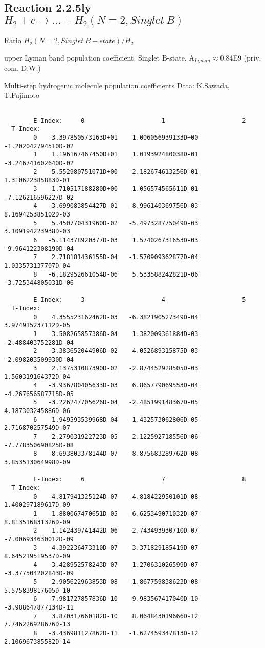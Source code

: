 \documentclass[12pt,dvipdfmx]{article}
\begin{document}
\newpage


\subsection{
Reaction 2.2.5ly $H_2 + e \rightarrow ...+ H_2(N=2,Singlet \ B)$}

Ratio $H_2(N=2, Singlet \ B-state)/H_2 $

upper Lyman band population coefficient. Singlet B-state, A$_{Lyman} \approx $0.84E9 (priv. com. D.W.)

 Multi-step hydrogenic molecule population coefficients
 Data: K.Sawada, T.Fujimoto \cite{kn:Sawada}
\begin{small}\begin{verbatim}

        E-Index:     0                     1                     2
  T-Index:
        0   -3.397850573163D+01    1.006056939133D+00   -1.202042794510D-02
        1    1.196167467450D+01    1.019392480038D-01   -3.246741602640D-02
        2   -5.552980751071D+00   -2.182674613256D-01    1.310622385883D-01
        3    1.710517188280D+00    1.056574565611D-01   -7.126216596227D-02
        4   -3.699083854427D-01   -8.996140369756D-03    8.169425385102D-03
        5    5.450770431960D-02   -5.497328775049D-03    3.109194223938D-03
        6   -5.114378920377D-03    1.574026731653D-03   -9.964122308190D-04
        7    2.718181436155D-04   -1.570909362877D-04    1.033573137707D-04
        8   -6.182952661054D-06    5.533588242821D-06   -3.725344805031D-06

        E-Index:     3                     4                     5
  T-Index:
        0    4.355523162462D-03   -6.382190527349D-04    3.974915237112D-05
        1    3.508265857386D-04    1.382009361884D-03   -2.488403752281D-04
        2   -3.383652044906D-02    4.052689315875D-03   -2.098203509930D-04
        3    2.137531087390D-02   -2.874452928505D-03    1.560319164372D-04
        4   -3.936780405633D-03    6.865779069553D-04   -4.267656587715D-05
        5   -3.226247705626D-04   -2.485199148367D-05    4.187303245886D-06
        6    1.949593539968D-04   -1.432573062806D-05    2.716870257549D-07
        7   -2.279031922723D-05    2.122592718556D-06   -7.778350690825D-08
        8    8.693803378144D-07   -8.875683289762D-08    3.853513064998D-09

        E-Index:     6                     7                     8
  T-Index:
        0   -4.817941325124D-07   -4.818422950101D-08    1.400297189617D-09
        1    1.880067470651D-05   -6.625349071032D-07    8.813516831326D-09
        2    1.142439741442D-06    2.743493930710D-07   -7.006934630012D-09
        3    4.392236473310D-07   -3.371829185419D-07    8.645219519537D-09
        4   -3.428952578243D-07    1.270631026599D-07   -3.377504202843D-09
        5    2.905622963853D-08   -1.867759838623D-08    5.575839817605D-10
        6   -7.981727857836D-10    9.983567417040D-10   -3.988647877134D-11
        7    3.870317660182D-10    8.064843019666D-12    7.746226928676D-13
        8   -3.436981127862D-11   -1.627459347813D-12    2.106967385582D-14


\end{verbatim}
\end{small}
\end{document}
